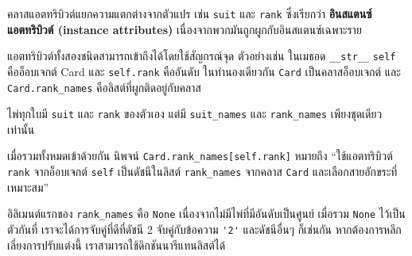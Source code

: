

คลาสแอตทริบิวต์แยกความแตกต่างจากตัวแปร เช่น {\tt suit} และ {\tt rank} ซึ่งเรียกว่า {\bf อินสแตนซ์แอตทริบิวต์  (instance attributes)} 
เนื่องจากพวกมันถูกผูกกับอินสแตนซ์เฉพาะราย


แอตทริบิวต์ทั้งสองชนิดสามารถเข้าถึงได้โดยใช้สัญกรณ์จุด ตัวอย่างเช่น ในเมธอด \verb"__str__" {\tt self} คืออ็อบเจกต์ Card และ {\tt self.rank} คืออันดับ 
ในทำนองเดียวกัน {\tt Card} เป็นคลาสอ็อบเจกต์ และ \verb"Card.rank_names" คือลิสต์ที่ผูกติดอยู่กับคลาส


ไพ่ทุกใบมี {\tt suit} และ {\tt rank} ของตัวเอง แต่มี \verb"suit_names" และ \verb"rank_names" เพียงชุดเดียวเท่านั้น


เมื่อรวมทั้งหมดเข้าด้วยกัน นิพจน์ \verb"Card.rank_names[self.rank]" หมายถึง 
``ใช้แอตทริบิวต์ {\tt rank} จากอ็อบเจกต์ {\tt self} เป็นดัชนีในลิสต์ \verb"rank_names" จากคลาส {\tt Card} และเลือกสายอักขระที่เหมาะสม''



อิลิเมนต์แรกของ \verb"rank_names" คือ {\tt None} เนื่องจากไม่มีไพ่ที่มีอันดับเป็นศูนย์ เมื่อรวม {\tt None} ไว้เป็นตัวกันที่ 
เราจะได้การจับคู่ที่ดีที่ดัชนี 2 จับคู่กับข้อความ \verb"'2'" และดัชนีอื่นๆ ก็เช่นกัน หากต้องการหลีกเลี่ยงการปรับแต่งนี้ เราสามารถใช้ดิกชันนารีแทนลิสต์ได้


